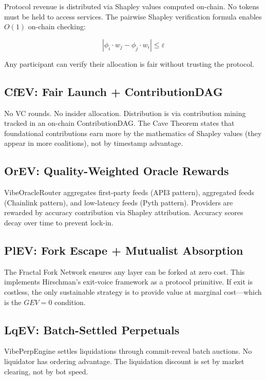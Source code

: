 \documentclass[11pt, a4paper]{article}
\begin{document}
Protocol revenue is distributed via Shapley values computed on-chain. No tokens must be held to access services. The pairwise Shapley verification formula enables $O(1)$ on-chain checking:

\begin{equation}
    |\phi_i \cdot w_j - \phi_j \cdot w_i| \leq \varepsilon
    \label{eq:pairwise}
\end{equation}

Any participant can verify their allocation is fair without trusting the protocol.

\subsection{CfEV: Fair Launch + ContributionDAG}

No VC rounds. No insider allocation. Distribution is via contribution mining tracked in an on-chain ContributionDAG. The Cave Theorem states that foundational contributions earn more by the mathematics of Shapley values (they appear in more coalitions), not by timestamp advantage.

\subsection{OrEV: Quality-Weighted Oracle Rewards}

VibeOracleRouter aggregates first-party feeds (API3 pattern), aggregated feeds (Chainlink pattern), and low-latency feeds (Pyth pattern). Providers are rewarded by accuracy contribution via Shapley attribution. Accuracy scores decay over time to prevent lock-in.

\subsection{PlEV: Fork Escape + Mutualist Absorption}

The Fractal Fork Network ensures any layer can be forked at zero cost. This implements Hirschman's exit-voice framework \citep{hirschman1970} as a protocol primitive. If exit is costless, the only sustainable strategy is to provide value at marginal cost---which is the $GEV = 0$ condition.

\subsection{LqEV: Batch-Settled Perpetuals}

VibePerpEngine settles liquidations through commit-reveal batch auctions. No liquidator has ordering advantage. The liquidation discount is set by market clearing, not by bot speed.
\end{document}
